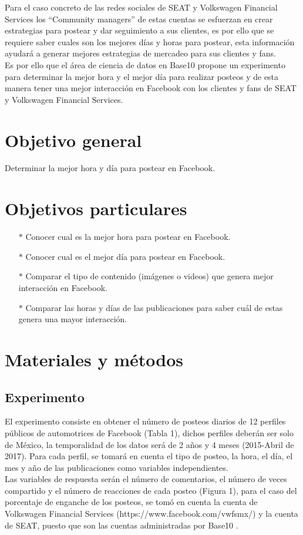 \documentclass[a4paper,10pt]{article}
\begin{document}
Para el caso concreto de las redes sociales de SEAT y Volkswagen Financial Services
los ``Community managers'' de estas cuentas se esfuerzan en crear estrategias para postear y dar seguimiento a sus clientes,
es por ello que se requiere saber cuales son los mejores días y horas para postear, esta información ayudará a generar mejores estrategias
de mercadeo para sus clientes y fans.\\


Es por ello que el área de ciencia de datos en Base10 propone un experimento
para determinar la mejor hora y el mejor día para realizar posteos y de esta manera
tener una mejor interacción en Facebook con los clientes y fans de SEAT y Volkswagen Financial Services.


\section{Objetivo general}
Determinar la mejor hora y día para postear en Facebook.

\section{Objetivos particulares}
  \begin{itemize}
   \item[$*$] Conocer cual es la  mejor hora para postear en Facebook.
   \item[$*$] Conocer cual es el mejor día para postear en Facebook.
   \item[$*$] Comparar el tipo de contenido (imágenes o videos) que genera mejor interacción en Facebook.
   \item[$*$] Comparar las horas y días de las publicaciones para saber cuál de estas genera una  mayor interacción.
  \end{itemize}


\section{Materiales y métodos}
\subsection{Experimento}
El experimento consiste en obtener el número de posteos diarios de 12 perfiles
públicos de automotrices de Facebook (Tabla 1), dichos perfiles deberán ser solo de México, 
la temporalidad de los datos será de  2 años y 4 meses (2015-Abril de 2017).
Para cada perfil, se tomará en cuenta el tipo de posteo, la hora, el día, el mes y año de 
las publicaciones como variables independientes.\\
Las variables de respuesta serán el número de comentarios,
el número de veces compartido y el número de reacciones de cada posteo (Figura 1),
para el caso del porcentaje de enganche de los posteos, se tomó en cuenta
la cuenta de Volkswagen Financial Services (https://www.facebook.com/vwfsmx/)
y la cuenta de SEAT, puesto que son las cuentas administradas por Base10 .
\end{document}
